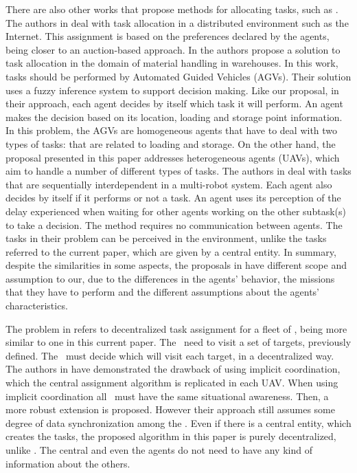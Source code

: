 There are also other works that propose methods for allocating tasks, such as \cite{iijima2016analysis,iijima2017adaptive,branisso2013multi,brutschy2014self}. The authors in \cite{iijima2016analysis,iijima2017adaptive} deal with task allocation in a distributed environment such as the Internet. This assignment is based on the preferences declared by the agents, being closer to an auction-based approach. In \cite{branisso2013multi} the authors propose a solution to task allocation in the domain of material handling in warehouses. In this work, tasks should be performed by Automated Guided Vehicles (AGVs). Their solution uses a fuzzy inference system to support decision making. Like our proposal, in their approach, each agent decides by itself which task it will perform. An agent makes the decision based on its location, loading and storage point information. In this problem, the AGVs are homogeneous agents that have to deal with two types of tasks: that are related to loading and storage. On the other hand, the proposal presented in this paper addresses heterogeneous agents (UAVs), which aim to handle a number of different types of tasks. The authors in \cite{brutschy2014self} deal with tasks that are sequentially interdependent in a multi-robot system. Each agent also decides by itself if it performs or not  a task. An agent uses its perception of the delay experienced when waiting for other agents working on the other subtask(s) to take a decision. The method requires no communication between agents. The tasks in their problem can be perceived in the environment, unlike the tasks referred to the current paper, which are given by a central entity. In summary, despite the similarities in some aspects, the proposals in \cite{branisso2013multi,brutschy2014self} have different scope and assumption to our, due to the differences in the agents’ behavior, the missions that they have to perform and the different assumptions about the agents’ characteristics. 

The problem in \cite{alighanbari2005decentralized} refers to decentralized task assignment for a fleet of \uavs, being more similar to one in this current paper. The \uavs\ need to visit a set of targets, previously defined. The \uavs\ must decide which will visit each target, in a decentralized way. The authors in \cite{alighanbari2005decentralized} have demonstrated the drawback of using implicit coordination, which the central assignment algorithm is replicated in each UAV. When using implicit coordination all \uavs\ must have the same situational awareness. Then, a more robust extension is proposed. However their approach still assumes some degree of data synchronization among the \uavs. Even if there is a central entity, which creates the tasks, the proposed algorithm in this paper is purely decentralized, unlike \cite{alighanbari2005decentralized, tolmidis2013multi}. The central and even the agents do not need to have any kind of information about the others.
